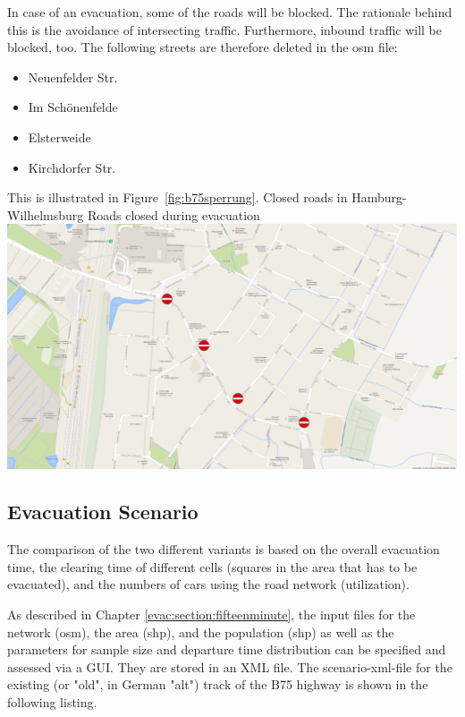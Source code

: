 In case of an evacuation, some of the roads will be blocked. The rationale behind this is the avoidance of intersecting traffic. Furthermore, inbound traffic will be blocked, too. The following streets are therefore deleted in the osm file:
%
\begin{itemize}
	\item Neuenfelder Str. 
	\item Im Schönenfelde
	\item Elsterweide
	\item Kirchdorfer Str.
\end{itemize}
%
This is illustrated in Figure~\ref{fig:b75sperrung}.
%
%
\createfigure%
{Closed roads in Hamburg-Wilhelmsburg}%
{Roads closed during evacuation}%
{\label{fig:b75sperrung}}%
{\includegraphics[width=0.7\linewidth]{using/figures/B75sperrung}}%
{}

\subsection{Evacuation Scenario}
The comparison of the two different variants is based on the overall evacuation time, the clearing time of different cells (squares in the area that has to be evacuated), and the numbers of cars using the road network (utilization).

As described in Chapter \ref{evac:section:fifteenminute}, the input files for the network (osm), the area (shp), and the population (shp) as well as the parameters for sample size and departure time distribution can be specified and assessed via a GUI. They are stored in an XML file. The scenario-xml-file for the existing (or "old", in German "alt") track of the B75 highway is shown in the following listing. 




